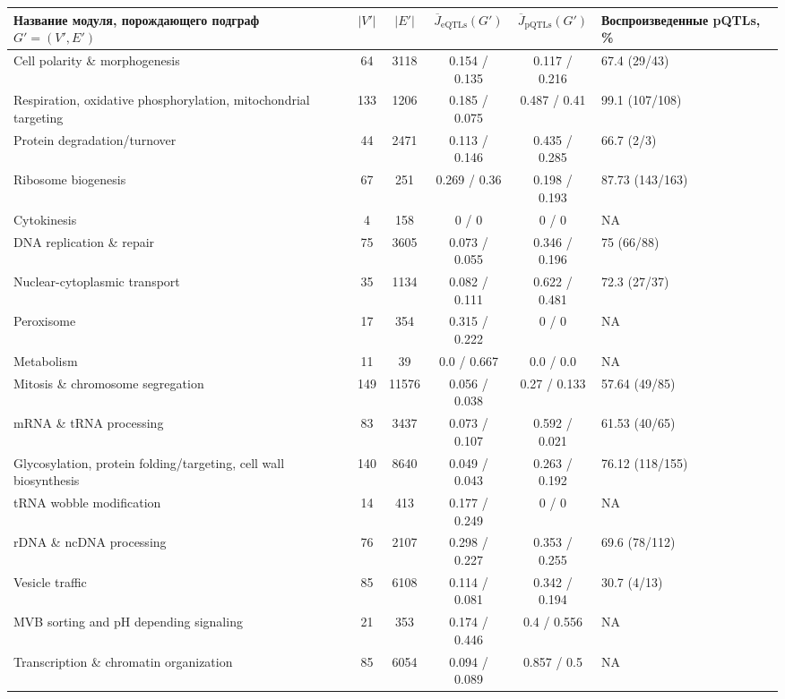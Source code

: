 \documentclass[11pt,a4paper]{report}
\theoremstyle{definition}
\theoremstyle{definition}
\theoremstyle{definition}
\begin{document}
	\begin{tabular} {| L{6cm} | c | c | c | c | C{3cm}| }
		\hline
		\textbf{Название модуля}, порождающего подграф $G' = (V', E')$ & $|V'|$ & $|E'|$ & $\overline{J}_{\text{eQTLs}}(G')$ & $\overline{J}_{\text{pQTLs}} (G')$ & Воспроизведенные pQTLs, \% \\
		\hline 
		Cell polarity \& morphogenesis & 64 & 3118 & 0.154 / 0.135 & 0.117 / 0.216& 67.4 (29/43)\\
		\hline 
		Respiration, oxidative phosphorylation, mitochondrial targeting & 133 & 1206 & 0.185 / 0.075 & 0.487 / 0.41 & 99.1 (107/108)\\
		\hline 
		Protein degradation/turnover & 44 & 2471 & 0.113 / 0.146 & 0.435 / 0.285& 66.7 (2/3)\\
		\hline 
		Ribosome biogenesis & 67 & 251 & 0.269  / 0.36 & 0.198 / 0.193& 87.73 (143/163)\\
		\hline 
		Cytokinesis & 4 & 158 & 0 / 0 & 0 / 0& NA\\
		\hline 
		DNA replication \& repair & 75 & 3605 & 0.073 / 0.055 & 0.346 / 0.196& 75 (66/88)\\
		\hline 
		Nuclear-cytoplasmic transport & 35 & 1134 & 0.082 / 0.111 & 0.622 / 0.481& 72.3 (27/37)\\
		\hline 
		Peroxisome & 17 & 354 & 0.315 / 0.222 & 0 / 0 & NA\\
		\hline 
		Metabolism & 11 & 39 & 0.0 / 0.667 & 0.0 / 0.0& NA\\
		\hline 
		Mitosis \& chromosome segregation & 149 & 11576 & 0.056 / 0.038 & 0.27 / 0.133& 57.64 (49/85)\\
		\hline 
		mRNA \& tRNA processing & 83 & 3437 & 0.073 / 0.107 & 0.592 / 0.021& 61.53 (40/65)\\
		\hline 
		Glycosylation, protein folding/targeting, cell wall biosynthesis & 140 & 8640 & 0.049 / 0.043 & 0.263 / 0.192& 76.12 (118/155)\\
		\hline 
		tRNA wobble modification & 14 & 413 & 0.177 / 0.249 & 0 / 0& NA\\
		\hline 
		rDNA \& ncDNA processing & 76 & 2107 & 0.298 / 0.227 & 0.353 / 0.255& 69.6 (78/112)\\
		\hline 
		Vesicle traffic & 85 & 6108 & 0.114 / 0.081 & 0.342 / 0.194& 30.7 (4/13)\\
		\hline 
		MVB sorting and pH depending signaling & 21 & 353 & 0.174 / 0.446 & 0.4 / 0.556 & NA\\
		\hline 
		Transcription \& chromatin organization & 85 & 6054 & 0.094 / 0.089 & 0.857 / 0.5 & NA\\
		\hline
	\end{tabular}
	\medskip
	
\end{document}
